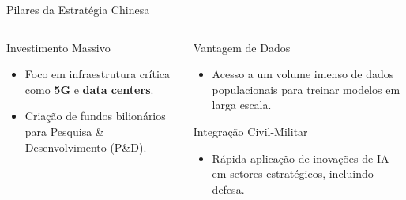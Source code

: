\documentclass[aspectratio=169,12pt]{beamer}
\begin{document}
\begin{frame}{Pilares da Estratégia Chinesa}
    \begin{columns}[T]
        \begin{column}{0.5\textwidth}
            \begin{block}{Investimento Massivo}
                \begin{itemize}
                    \item Foco em infraestrutura crítica como \textbf{5G} e \textbf{data centers}.
                    \item Criação de fundos bilionários para Pesquisa \& Desenvolvimento (P\&D).
                \end{itemize}
            \end{block}
        \end{column}
        
        \begin{column}{0.5\textwidth}
            \begin{block}{Vantagem de Dados}
                \begin{itemize}
                    \item Acesso a um volume imenso de dados populacionais para treinar modelos em larga escala.
                \end{itemize}
            \end{block}
            
            \begin{block}{Integração Civil-Militar}
                \begin{itemize}
                    \item Rápida aplicação de inovações de IA em setores estratégicos, incluindo defesa.
                \end{itemize}
            \end{block}
        \end{column}
    \end{columns}
\end{frame}
\end{document}
